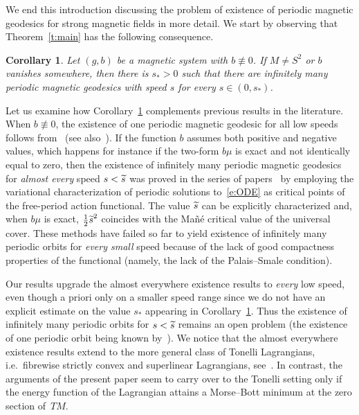 \documentclass[10pt]{amsart}
\newtheorem{coro}[cdrthm]{Corollary}
\theoremstyle{definition}
\let\oldtilde\tilde
\renewcommand*{\tilde}[1]{\mathchoice{\widetilde{#1}}{\widetilde{#1}}{\oldtilde{#1}}{\oldtilde{#1}}}
\begin{document}
We end this introduction discussing the problem of existence of periodic magnetic geodesics for strong magnetic fields in more detail. We start by observing that Theorem~\ref{t:main} has the following consequence.

\begin{coro}\label{c:nons2}
Let $(g,b)$ be a magnetic system with $b\not\equiv 0$. If $M\neq S^2$ or $b$ vanishes somewhere, then there is $s_*>0$ such that there are infinitely many periodic magnetic geodesics with speed $s$ for every $s\in (0,s_*)$.
\end{coro}

Let us examine how Corollary~\ref{c:nons2} complements previous results in the literature. When $b\not\equiv 0$, the existence of one periodic magnetic geodesic for all low speeds follows from~\cite{Ginzburg:1987lq} (see also~\cite{AB21}). If the function $b$ assumes both positive and negative values, which happens for instance if the two-form $b\mu$ is exact and not identically equal to zero, then the existence of infinitely many periodic magnetic geodesics for \emph{almost every} speed $s<\tilde s$ was proved in the series of papers~\cite{Abbondandolo:2017,Asselle:2015ij,Asselle:2015hc,Abbondandolo:2014rb,Abbondandolo:2015lt} by employing the variational characterization of periodic solutions to~\eqref{e:ODE} as critical points of the free-period action functional. The value $\tilde s$ can be explicitly characterized and, when $b\mu$ is exact, $\tfrac12{\tilde s}^2$ coincides with the Mañé critical value of the universal cover. These methods have failed so far to yield existence of infinitely many periodic orbits for \emph{every small} speed because of the lack of good compactness properties of the functional (namely, the lack of the Palais--Smale condition).

Our results upgrade the almost everywhere existence results to \emph{every} low speed, even though a priori only on a smaller speed range since we do not have an explicit estimate on the value $s_*$ appearing in Corollary~\ref{c:nons2}. Thus the existence of infinitely many periodic orbits for $s<\tilde s$ remains an open problem (the existence of one periodic orbit being known by~\cite{Contreras:2004lv,Taimanov:1992fs}). We notice that the almost everywhere existence results extend to the more general class of Tonelli Lagrangians, i.e.~fibrewise strictly convex and superlinear Lagrangians, see~\cite{Asselle:2016qv}. In contrast, the arguments of the present paper seem to carry over to the Tonelli setting only if the energy function of the Lagrangian attains a Morse--Bott minimum at the zero section of~$TM$.
\end{document}
